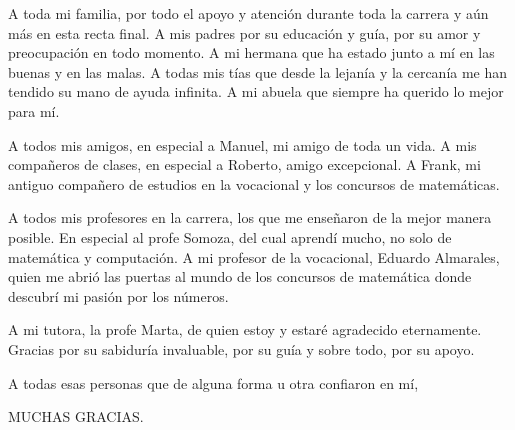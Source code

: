 \begin{acknowledgements}

A toda mi familia, por todo el apoyo y atenci\'on durante toda la carrera y a\'un m\'as en esta recta final. A mis padres por su educaci\'on y gu\'ia, por su amor y preocupaci\'on en todo momento. A mi hermana que ha estado junto a m\'i en las buenas y en las malas. A todas mis t\'ias que desde la lejan\'ia y la cercan\'ia me han tendido su mano de ayuda infinita. A mi abuela que siempre ha querido lo mejor para m\'i.

A todos mis amigos, en especial a Manuel, mi amigo de toda un vida. A mis compa\~neros de clases, en especial a Roberto, amigo excepcional. A Frank, mi antiguo compa\~nero de estudios en la vocacional y los concursos de matem\'aticas.

A todos mis profesores en la carrera, los que me ense\~naron de la mejor manera posible. En especial al profe Somoza, del cual aprend\'i mucho, no solo de matem\'atica y computaci\'on. A mi profesor de la vocacional, Eduardo Almarales, quien me abri\'o las puertas al mundo de los concursos de matem\'atica donde descubr\'i mi pasi\'on por los n\'umeros.

A mi tutora, la profe Marta, de quien estoy y estar\'e agradecido eternamente. Gracias por su sabidur\'ia invaluable, por su gu\'ia y sobre todo, por su apoyo.

\qquad

A todas esas personas que de alguna forma u otra confiaron en m\'i,
\begin{center}
	\Large
	MUCHAS GRACIAS.
\end{center}

\end{acknowledgements}